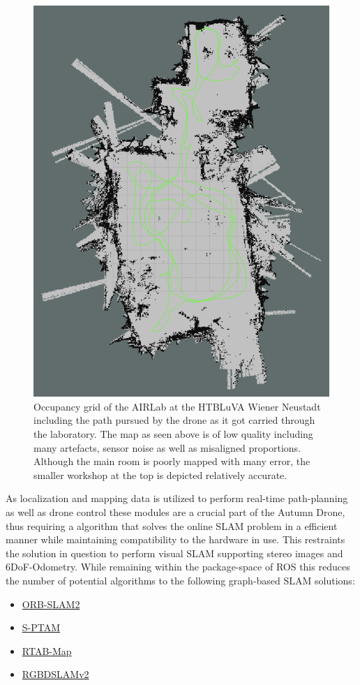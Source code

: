 \begin{figure}
	\centering
	\includegraphics[width=0.8\linewidth]{img/airlabMap}
	\caption{
		Occupancy grid of the AIRLab at the HTBLuVA Wiener Neustadt including the path pursued by the drone as it got carried through the laboratory. The map as seen above is of low quality including many artefacts, sensor noise as well as misaligned proportions.
		Although the main room is poorly mapped with many error, the smaller workshop at the top is depicted relatively accurate.
	}
	\label{fig:AirLABmap}
\end{figure}

As localization and mapping data is utilized to perform real-time path-planning as well as drone control these modules are a crucial part of the Autumn Drone, thus requiring a algorithm that solves the online SLAM problem in a efficient manner while maintaining compatibility to the hardware in use. This restraints the solution in question to perform visual SLAM supporting stereo images and 6DoF-Odometry. 
While remaining within the package-space of ROS this reduces the number of potential algorithms to the following graph-based SLAM solutions:
\begin{itemize}
	\item \href{https://github.com/raulmur/ORB_SLAM2}{ORB-SLAM2}
	\item \href{https://github.com/lrse/sptam}{S-PTAM}
	\item \href{http://introlab.github.io/rtabmap/}{RTAB-Map}
	\item \href{https://felixendres.github.io/rgbdslam_v2/}{RGBDSLAMv2}
\end{itemize}

